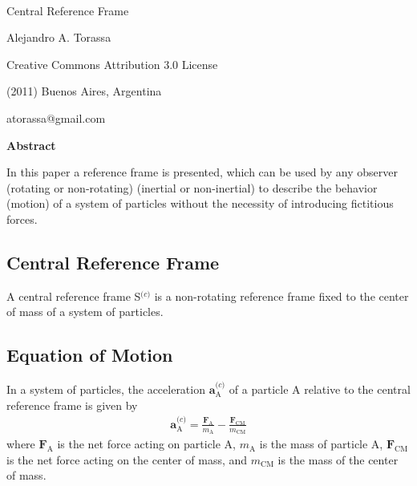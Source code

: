 \documentclass[10pt]{article}
\newcommand{\mm}{m}
\newcommand{\vA}{\mathbf{a}}
\newcommand{\vF}{\mathbf{F}}
\newcommand{\ra}{_{\scriptscriptstyle \mathrm A}}
\newcommand{\rc}{^{\scriptscriptstyle \mathrm (c)}}
\newcommand{\rs}{_{\scriptscriptstyle \mathrm {CM}}}
\begin{document}
\ \vspace{-0.6em}

\begin{center}

{\LARGE Central Reference Frame}

\bigskip \medskip

{\large Alejandro A. Torassa}

\bigskip \medskip

\footnotesize

Creative Commons Attribution 3.0 License

(2011) Buenos Aires, Argentina

atorassa@gmail.com

\bigskip \smallskip

\small

{\bf Abstract}

\bigskip

\parbox{89mm}{In this paper a reference frame is presented, which can be used by any observer (rotating or non-rotating) (inertial or non-inertial) to describe the behavior (motion) of a system of particles without the necessity of introducing fictitious forces.}

\vspace{+0.3em}

\end{center}

\normalsize

{\centering\subsection*{Central Reference Frame}}

\par A central reference frame S$\rc$ is a non-rotating reference frame fixed to the center of mass of a system of particles.

\vspace{+0.6em}

{\centering\subsection*{Equation of Motion}}

\par In a system of particles, the acceleration $\vA\ra\rc$ of a particle A relative to the central reference frame is given by
\begin{eqnarray*}
\vA\ra\rc = \frac{\vF\ra}{\mm\ra} - \frac{\vF\rs}{\mm\rs}
\end{eqnarray*}
\noindent where $\vF\ra$ is the net force acting on particle A, $\mm\ra$ is the mass of particle A, $\vF\rs$ is the net force acting on the center of mass, and $\mm\rs$ is the mass of the center of mass.
\end{document}
